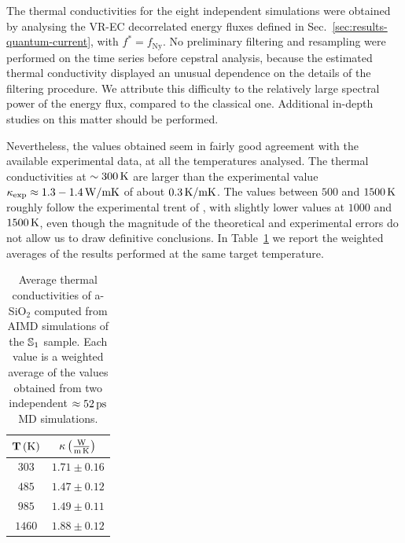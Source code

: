 The \abinitio thermal conductivities for the eight independent simulations were obtained by analysing the VR-EC decorrelated energy fluxes defined in Sec.~\ref{sec:results-quantum-current}, with $f^*=f_\mathrm{Ny}$. 
No preliminary filtering and resampling were performed on the time series before cepstral analysis, because the estimated thermal conductivity displayed an unusual dependence on the details of the filtering procedure. We attribute this difficulty to the relatively large spectral power of the \abinitio energy flux, compared to the classical one. 
Additional in-depth studies on this matter should be performed. 

Nevertheless, the values obtained seem in fairly good agreement with the available experimental data, at all the temperatures analysed. 
The thermal conductivities at $\sim 300\,\mathrm{K}$ are larger than the experimental value $\kappa_{\mathrm{exp}}\approx 1.3-1.4\,\mathrm{W/mK}$ of about $0.3\,\mathrm{K/mK}$. 
The values between $500$ and $1500\,\mathrm{K}$ roughly follow the experimental trent of \citet{Cahill1990}, with slightly lower values at $1000$ and $1500\,\mathrm{K}$, even though the magnitude of the theoretical and experimental errors do not allow us to draw definitive conclusions. 
In Table~\ref{tab:results-quantum-wkappa} we report the weighted averages of the \abinitio results performed at the same target temperature.

\begin{table}[!tb]
    \centering
    \begin{tabular}{c|c}
        $\mathbf{T}\,\mathrm{(K)}$ & $\mathbf{\kappa}\,\mathrm{\left(\frac{W}{m\,K}\right)}$ \\
        \hline
        $303$ & $1.71 \pm 0.16$ \\
        $485$ & $1.47 \pm 0.12$ \\
        $985$ & $1.49 \pm 0.11$ \\
        $1460$ & $1.88 \pm 0.12$ \\
    \end{tabular}
    \caption{Average thermal conductivities of a-SiO$_2$ computed from AIMD simulations of the $\S1$ sample. Each value is a weighted average of the values obtained from two independent $\approx 52\,\mathrm{ps}$ MD simulations.}
    \label{tab:results-quantum-wkappa}
\end{table}

